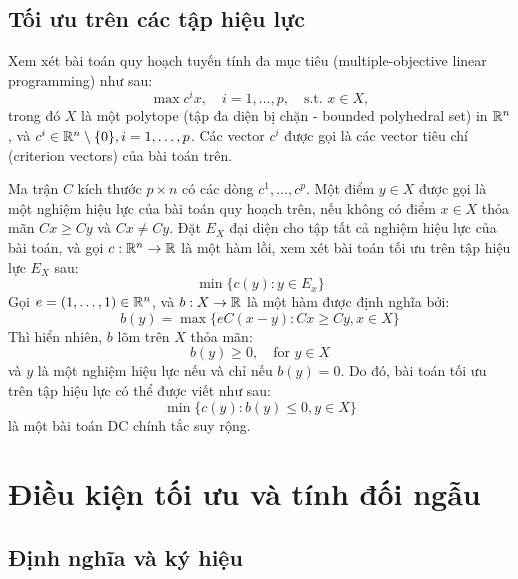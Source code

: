 \documentclass[a4paper]{report}
\begin{document}
    \section{Tối ưu trên các tập hiệu lực}
    Xem xét bài toán quy hoạch tuyến tính đa mục tiêu (multiple-objective linear programming) như sau:
    \begin{equation}
        \max{c^ix},\quad i=1,\dots,p,\quad\text{s.t. } x \in X,
    \end{equation}
    trong đó $X$ là một polytope (tập đa diện bị chặn - bounded polyhedral set) in $\mathbb{R}^n$, và $c^i \in \mathbb{R}^n \setminus \{0\}, i = 1,\dots,p$. Các vector $c^i$ được gọi là các vector tiêu chí (criterion vectors) của bài toán trên. 

    Ma trận $C$ kích thước $p \times n$ có các dòng $c^1, \dots, c^p$. Một điểm $y \in X$ được gọi là một nghiệm hiệu lực của bài toán quy hoạch trên, nếu không có điểm $x \in X$ thỏa mãn $Cx \geq Cy$ và $Cx \ne Cy$. Đặt $E_X$ đại diện cho tập tất cả nghiệm
    hiệu lực của bài toán, và gọi $c: \mathbb{R}^n \rightarrow \mathbb{R}$ là một hàm lồi, xem xét bài toán tối ưu trên tập hiệu lực $E_X$ sau: 
    \begin{equation}
        \min\{c(y): y \in E_x\}
    \end{equation}
    Gọi $e = (1, \dots, 1) \in \mathbb{R}^n$, và $b: X \rightarrow \mathbb{R}$ là một hàm được định nghĩa bởi:
    \begin{equation}
        b(y) = \max\{eC(x - y): Cx \geq Cy, x \in X\}
    \end{equation}
    Thì hiển nhiên, $b$ lõm trên $X$ thỏa mãn:
    \begin{equation}
        b(y) \geq 0,\quad\text{for }y \in X
    \end{equation}
    và $y$ là một nghiệm hiệu lực nếu và chỉ nếu $b(y) = 0$. Do đó, bài toán tối ưu trên tập hiệu lực có thể được viết như sau:
    \begin{equation}
        \min\{c(y): b(y) \leq 0, y \in X\}
    \end{equation}
    là một bài toán DC chính tắc suy rộng.
    \chapter{Điều kiện tối ưu và tính đối ngẫu}
    \label{chap:optim_cond_duality}

    \section{Định nghĩa và ký hiệu}
    \label{sec:definition_notion}
\end{document}
